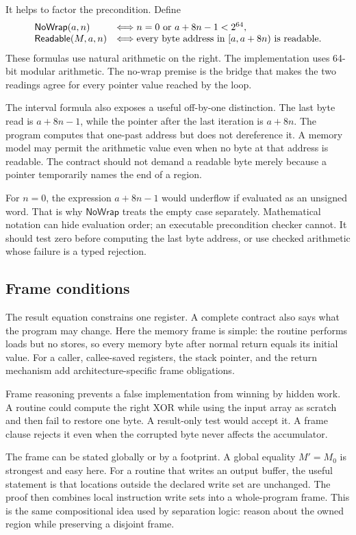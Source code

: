 It helps to factor the precondition. Define
\[
 \begin{array}{ll}
 \mathsf{NoWrap}(a,n) &\Longleftrightarrow
   n=0\ \hbox{or}\ a+8n-1<2^{64},\\
 \mathsf{Readable}(M,a,n) &\Longleftrightarrow
   \hbox{every byte address in }[a,a+8n)\hbox{ is readable}.
 \end{array}
\]
These formulas use natural arithmetic on the right. The implementation uses
64-bit modular arithmetic. The no-wrap premise is the bridge that makes the
two readings agree for every pointer value reached by the loop.

The interval formula also exposes a useful off-by-one distinction. The last
byte read is \(a+8n-1\), while the pointer after the last iteration is
\(a+8n\). The program computes that one-past address but does not dereference
it. A memory model may permit the arithmetic value even when no byte at that
address is readable. The contract should not demand a readable byte merely
because a pointer temporarily names the end of a region.

For \(n=0\), the expression \(a+8n-1\) would underflow if evaluated as an
unsigned word. That is why \(\mathsf{NoWrap}\) treats the empty case
separately. Mathematical notation can hide evaluation order; an executable
precondition checker cannot. It should test zero before computing the last
byte address, or use checked arithmetic whose failure is a typed rejection.

\subsection{Frame conditions}

The result equation constrains one register. A complete contract also says
what the program may change. Here the memory frame is simple: the routine
performs loads but no stores, so every memory byte after normal return equals
its initial value. For a caller, callee-saved registers, the stack pointer,
and the return mechanism add architecture-specific frame obligations.

Frame reasoning prevents a false implementation from winning by hidden work.
A routine could compute the right XOR while using the input array as scratch
and then fail to restore one byte. A result-only test would accept it. A frame
clause rejects it even when the corrupted byte never affects the accumulator.

The frame can be stated globally or by a footprint. A global equality
\(M'=M_0\) is strongest and easy here. For a routine that writes an output
buffer, the useful statement is that locations outside the declared write set
are unchanged. The proof then combines local instruction write sets into a
whole-program frame. This is the same compositional idea used by separation
logic: reason about the owned region while preserving a disjoint frame.

